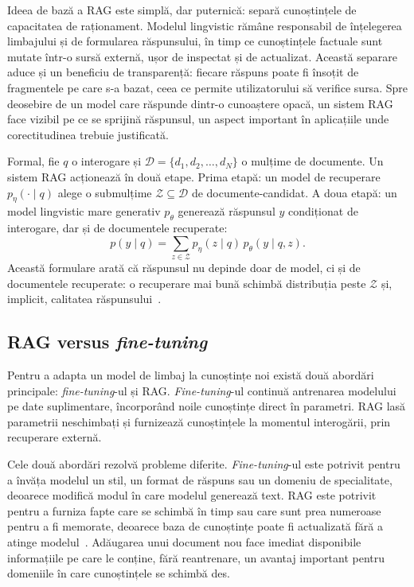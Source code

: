 Ideea de bază a RAG este simplă, dar puternică: separă cunoștințele de capacitatea de raționament. Modelul lingvistic rămâne responsabil de înțelegerea limbajului și de formularea răspunsului, în timp ce cunoștințele factuale sunt mutate într-o sursă externă, ușor de inspectat și de actualizat. Această separare aduce și un beneficiu de transparență: fiecare răspuns poate fi însoțit de fragmentele pe care s-a bazat, ceea ce permite utilizatorului să verifice sursa. Spre deosebire de un model care răspunde dintr-o cunoaștere opacă, un sistem RAG face vizibil pe ce se sprijină răspunsul, un aspect important în aplicațiile unde corectitudinea trebuie justificată.

Formal, fie $q$ o interogare și $\mathcal{D}=\{d_1,d_2,\dots,d_N\}$ o mulțime de documente. Un sistem RAG acționează în două etape. Prima etapă: un model de recuperare $p_\eta(\cdot \mid q)$ alege o submulțime $\mathcal{Z} \subseteq \mathcal{D}$ de documente-candidat. A doua etapă: un model lingvistic mare generativ $p_\theta$ generează răspunsul $y$ condiționat de interogare, dar și de documentele recuperate:
\begin{equation}
p(y \mid q) = \sum_{z \in \mathcal{Z}} p_\eta(z \mid q)\, p_\theta(y \mid q, z).
\label{eq:rag-marginal}
\end{equation}
Această formulare arată că răspunsul nu depinde doar de model, ci și de documentele recuperate: o recuperare mai bună schimbă distribuția peste $\mathcal{Z}$ și, implicit, calitatea răspunsului~\cite{lewis2020rag}.

\subsection{RAG versus \textit{fine-tuning}}

Pentru a adapta un model de limbaj la cunoștințe noi există două abordări principale: \textit{fine-tuning}-ul și RAG. \textit{Fine-tuning}-ul continuă antrenarea modelului pe date suplimentare, încorporând noile cunoștințe direct în parametri. RAG lasă parametrii neschimbați și furnizează cunoștințele la momentul interogării, prin recuperare externă.

Cele două abordări rezolvă probleme diferite. \textit{Fine-tuning}-ul este potrivit pentru a învăța modelul un stil, un format de răspuns sau un domeniu de specialitate, deoarece modifică modul în care modelul generează text. RAG este potrivit pentru a furniza fapte care se schimbă în timp sau care sunt prea numeroase pentru a fi memorate, deoarece baza de cunoștințe poate fi actualizată fără a atinge modelul~\cite{gao2024retrievalaugmentedgenerationlargelanguage}. Adăugarea unui document nou face imediat disponibile informațiile pe care le conține, fără reantrenare, un avantaj important pentru domeniile în care cunoștințele se schimbă des.

